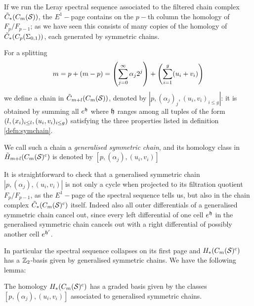 If we run the Leray spectral sequence associated to the filtered chain complex $\tilde{C}_*(C_m(\mathcal{S}))$,
the $E^1-$page contains on the $p-$th column the homology of $F_p/F_{p-1}$; as we have seen this consists of
many copies of the homology of $\tilde{C}_*(C_p(\Sigma_{0,1}))$, each generated by symmetric chains.

\begin{defn}
\label{defn:gensymchain}
For a splitting
\[
 m=p+(m-p)=\left(\sum_{j=0}^{\infty}\alpha_j2^j\right)+\left(\sum_{i=1}^g(u_i+v_i)\right)
\]
we define a chain in $\tilde{C}_{m+l}(C_m(\mathcal{S}))$, denoted by $|p,(\alpha_j)_j,(u_i,v_i)_{i\leq g}|$: it
is obtained by summing all $e^{\mathfrak{h}}$ where $\mathfrak{h}$
ranges among all tuples of the form $\left(l,(x_i)_{i\leq l},(u_i,v_i)_{i\leq g}\right)$
satisfying the three properties listed in definition \ref{defn:symchain}.

We call such a chain a
\emph{generalised symmetric chain}, and its homology class in $\tilde{H}_{m+l}(C_m(\mathcal{S})^c)$ is denoted
by $[p,(\alpha_j),(u_i,v_i)]$
\end{defn}

It is straightforward to check that a generalised symmetric chain $|p,(\alpha_j),(u_i,v_i)|$
is not only
a cycle when projected to its filtration quotient $F_p/F_{p-1}$, as the $E^1-$page
of the spectral sequence tells us, but also
in the chain complex $\tilde{C}_*(C_m(\mathcal{S})^c)$ itself. Indeed also all outer
differentials of a generalised symmetric chain cancel out, since
every left differential
of one cell $e^{\mathfrak{h}}$ in the generalised symmetric chain cancels out with a right differential
of possibly another cell $e^{\mathfrak{h}'}$.

In particular the spectral sequence collapses on its first page and $H_*(C_m(\mathcal{S})^c)$
has a $\mathbb{Z}_2$-basis given by generalised symmetric chains. We have the following lemma:
\begin{lem}
\label{lem:gensymchain}
The homology $H_*(C_m(\mathcal{S})^c)$ has a graded basis given by the classes $[p,(\alpha_j),(u_i,v_i)]$
associated to generalised symmetric chains.
\end{lem}


